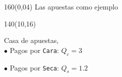 \documentclass[shownotes,aspectratio=169]{beamer}
\begin{document}
\begin{frame}[plain]
\begin{textblock}{160}(0,04) \centering
  \LARGE Las apuestas como ejemplo\\
\end{textblock}
\vspace{1.2cm}

\begin{textblock}{140}(10,16)
\begin{multicols*}{2}
\noindent
\large Casa de apuestas,\\[0.2cm]

\normalsize
$\bullet$ Pagos por \texttt{Cara}: $Q_c= 3$

$\bullet$ Pagos por \texttt{Seca}: $Q_s= 1.2$


\columnbreak



\end{multicols*}
\end{textblock}
\end{frame}
\end{document}
